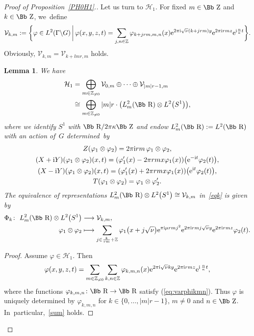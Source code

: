 \documentclass[10pt,a4paper]{amsart}
\newcommand\RR{{\mbox{\Bb R}}}
\newcommand\ZZ{{\mbox{\Bb Z}}}
\newcommand\Z{{\mathbb Z}}
\newcommand\cV{{\mathcal V}}
\newcommand\cH{{\mathcal H}}
\newcommand\ph{\varphi}
\numberwithin{equation}{section}
\newtheorem{Lemma}[Theorem]{Lemma}
\begin{document}
\begin{proof}[Proof of Proposition~\ref{PH0H1}.]
Let us turn to $\cH_1$. For fixed $m\in\ZZ$ and $k\in\ZZ$, we~define
\begin{gather*}
{\mathcal V}_{k,m}:=\bigg\{ \ph\in L^2(\Gamma\backslash G)\,\bigg| \, \varphi(x,y,z,t)=\sum_{j,n\in\Z}\varphi_{k+jrm,m,n}(x){\rm e}^{2\pi {\rm i}\sqrt\nu (k+jrm)y}{\rm e}^{2\pi {\rm i}rmz}{\rm e}^{{\rm i} \frac{n}{\kappa}t}\bigg\}.
\end{gather*}
Obviously, ${\mathcal V}_{k,m}={\mathcal V}_{k+lmr,m}$ holds.
\begin{Lemma} \label{LL1m} We have
\begin{align}
\cH_1&=\bigoplus_{m\in \Z_{\not=0}} \cV_{0,m}\oplus\dots\oplus\cV_{|m|r-1,m}\label{sum}
\\
&\cong\bigoplus_{m\in \Z_{\not=0}} |m|r\cdot \big( L^2_{m}(\RR)\otimes L^2\big(S^1\big)\big), \label{eqk}
\end{align}
where we identify $S^1$ with $\RR/2\pi\kappa \ZZ$ and endow $L^2_{m}(\RR):=L^2(\RR)$ with an action of~$G$ determi\-ned~by
\begin{gather}
Z(\ph_1\otimes\ph_2)=2\pi {\rm i} rm\,\ph_1\otimes\ph_2, \label{EmZ}
\\
(X+{\rm i}Y)(\ph_1\otimes\ph_2)(x,t)= ( \ph_1'(x)-2\pi rm x \ph_1(x)) \big({\rm e}^{-{\rm i}t} \ph_2(t)\big), \label{Em+}
\\
(X-{\rm i}Y)(\ph_1\otimes\ph_2)(x,t)= ( \ph_1'(x)+2\pi rm x \ph_1(x)) \big({\rm e}^{{\rm i}t} \ph_2(t)\big),\label{Em-}
\\
T(\ph_1\otimes\ph_2)=\ph_1\otimes \ph_2'.\label{EmT}
\end{gather}
The equivalence of representations $L^2_{m}(\RR)\otimes L^2\big(S^1\big) \cong {\mathcal V}_{k,m}$ in~\eqref{eqk} is given by
\begin{align*}
\Phi_k\colon\ L^2_{m}(\RR)\otimes L^2\big(S^1\big) &\longrightarrow{\mathcal V}_{k,m},
\\
\ph_1\otimes\ph_2&\longmapsto \sum_{j\in \frac k{rm}+\Z}
\varphi_1\big(x+j\sqrt\nu\big){\rm e}^{\pi {\rm i}\mu rmj^2}{\rm e}^{2\pi {\rm i}rmj\sqrt\nu y}{\rm e}^{2\pi {\rm i}rmz}\ph_2(t).
\end{align*}
\end{Lemma}

\begin{proof}
Assume $\varphi\in \cH_1$. Then
\begin{gather*}
\varphi(x,y,z,t)=\sum_{m\in\Z_{\not=0}}\sum_{k,n\in\Z}\varphi_{k,m,n}(x){\rm e}^{2\pi {\rm i}\sqrt\nu ky}{\rm e}^{2\pi {\rm i}rmz}{\rm e}^{{\rm i}\,\frac{n}{\kappa}t},
\end{gather*}
where the functions $\varphi_{k,m,n}\colon \RR\rightarrow\RR$ satisfy (\ref{eq:varphikmn}). Thus $\varphi$ is uniquely determined by
$\varphi_{k,m,n}$ for $k\in\{0,\dots,|m|r-1\}$, $m\neq 0$ and $n\in\ZZ$. In~particular,~\eqref{sum} holds.



\end{proof}
\end{proof}
\end{document}
